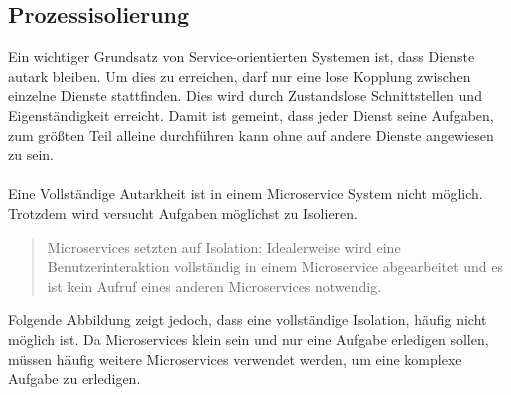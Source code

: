 \subsection{Prozessisolierung}
\label{subsec:Prozessisiolierung}
Ein wichtiger Grundsatz von Service-orientierten Systemen ist, dass Dienste autark bleiben. Um dies zu erreichen, darf nur eine lose Kopplung zwischen einzelne Dienste stattfinden. Dies wird durch Zustandslose Schnittstellen und Eigenständigkeit erreicht. Damit ist gemeint, dass jeder Dienst seine Aufgaben, zum größten Teil alleine durchführen kann ohne auf andere Dienste angewiesen zu sein.
\\\\
Eine Vollständige Autarkheit ist in einem Microservice System nicht möglich. Trotzdem wird versucht Aufgaben möglichst zu Isolieren.

\begin{quotation}
	\frqq Microservices setzten auf Isolation: Idealerweise wird eine Benutzerinteraktion vollständig in einem Microservice abgearbeitet und es ist kein Aufruf eines anderen Microservices notwendig.\flqq\ \cite[S. 90]{EWolff2016:Microservices}
\end{quotation}

Folgende Abbildung zeigt jedoch, dass eine vollständige Isolation, häufig nicht möglich ist. Da Microservices klein sein und nur eine Aufgabe erledigen sollen, müssen häufig weitere Microservices verwendet werden, um eine komplexe Aufgabe zu erledigen.

